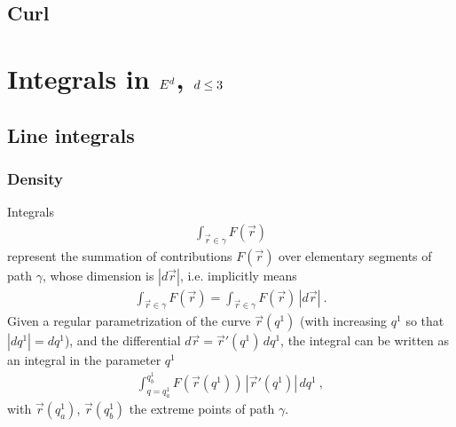 \documentclass[letterpaper,10pt,english]{jupyterBook}
\begin{document}
\subsection{Curl}
\label{\detokenize{ch/tensor-algebra-calculus/calculus-euclidean:curl}}\label{\detokenize{ch/tensor-algebra-calculus/calculus-euclidean:tensor-calculus-differential-operators-curl}}

\section{Integrals in \protect\(E^d\protect\), \protect\(d \le 3\protect\)}
\label{\detokenize{ch/tensor-algebra-calculus/calculus-euclidean:integrals-in-e-d-d-le-3}}\label{\detokenize{ch/tensor-algebra-calculus/calculus-euclidean:tensor-calculus-integrals}}

\subsection{Line integrals}
\label{\detokenize{ch/tensor-algebra-calculus/calculus-euclidean:line-integrals}}\label{\detokenize{ch/tensor-algebra-calculus/calculus-euclidean:tensor-calculus-integrals-line}}

\subsubsection{Density}
\label{\detokenize{ch/tensor-algebra-calculus/calculus-euclidean:density}}\label{\detokenize{ch/tensor-algebra-calculus/calculus-euclidean:tensor-calculus-integrals-line-density}}
\sphinxAtStartPar
Integrals
\begin{equation*}
\begin{split} \int_{\vec{r}\in\gamma} F(\vec{r})\end{split}
\end{equation*}
\sphinxAtStartPar
represent the summation of contributions \(F(\vec{r})\) over elementary segments of path \(\gamma\), whose dimension is \(|d \vec{r}|\), i.e. implicitly means
\begin{equation*}
\begin{split}\int_{\vec{r}\in\gamma} F(\vec{r}) = \int_{\vec{r} \in \gamma} F(\vec{r}) \, |d \vec{r}| \ .\end{split}
\end{equation*}
\sphinxAtStartPar
Given a regular parametrization of the curve \(\vec{r}(q^1)\) (with increasing \(q^1\) so that \(|dq^1| = dq^1\)), and the differential \(d \vec{r} = \vec{r}'(q^1) \, d q^1\), the integral can be written as an integral in the parameter \(q^1\)
\begin{equation*}
\begin{split}\int_{q=q^1_a}^{q^1_b} F(\vec{r}(q^1)) \, |\vec{r}'(q^1)| \, dq^1 \ ,\end{split}
\end{equation*}
\sphinxAtStartPar
with \(\vec{r}(q^1_a)\), \(\vec{r}(q^1_b)\) the extreme points of path \(\gamma\).
\end{document}

